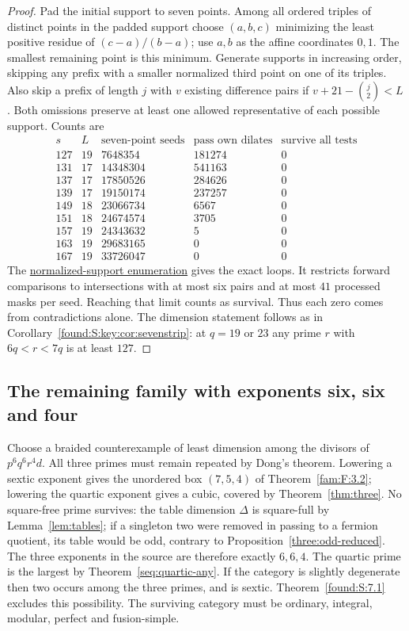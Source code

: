 \documentclass[11pt,a4paper]{article}
\numberwithin{equation}{section}
\theoremstyle{remark}
\begin{document}
\begin{proof}
Pad the initial support to seven points. Among all ordered triples of
distinct points in the padded support choose $(a,b,c)$ minimizing the
least positive residue of $(c-a)/(b-a)$; use $a,b$ as the affine
coordinates $0,1$. The smallest remaining point is this minimum.
Generate supports in increasing order, skipping any prefix with a
smaller normalized third point on one of its triples. Also skip a
prefix of length $j$ with $v$ existing difference pairs if
$v+21-\binom j2<L$. Both omissions preserve at least one allowed
representative of each possible support. Counts are
\[
\begin{array}{r|r|r|r|r}
s&L&\text{seven-point seeds}&\text{pass own dilates}&
\text{survive all tests}\\\hline
127&19&7648354&181274&0\\
131&17&14348304&541163&0\\
137&17&17850526&284626&0\\
139&17&19150174&237257&0\\
149&18&23066734&6567&0\\
151&18&24674574&3705&0\\
157&19&24343632&5&0\\
163&19&29683165&0&0\\
167&19&33726047&0&0
\end{array}
\]
The \href{https://github.com/sebastienpalcoux/WGT-fusion-categories/blob/f7f9f9a02f3116e61eb9dca4eebfed77001494e8/code/strip_extra.cpp}{normalized-support enumeration} gives the exact
loops. It restricts forward comparisons to intersections with at most
six pairs and at most $41$ processed masks per seed. Reaching that
limit counts as survival. Thus each zero comes from contradictions
alone. The dimension statement follows as in Corollary~\ref{found:S:key:cor:sevenstrip}:
at $q=19$ or $23$ any prime $r$ with $6q<r<7q$ is at least $127$.
\end{proof}

\subsection{The remaining family with exponents six, six and four}\label{sec:boundary}

Choose a braided counterexample of least dimension among the divisors of $p^6q^6r^4d$. All three primes must remain repeated by Dong's theorem. Lowering a sextic exponent gives the unordered box $(7,5,4)$ of Theorem~\ref{fam:F:3.2}; lowering the quartic exponent gives a cubic, covered by Theorem~\ref{thm:three}. No square-free prime survives: the table dimension $\Delta$ is square-full by Lemma~\ref{lem:tables}; if a singleton two were removed in passing to a fermion quotient, its table would be odd, contrary to Proposition~\ref{three:odd-reduced}. The three exponents in the source are therefore exactly $6,6,4$. The quartic prime is the largest by Theorem~\ref{seq:quartic-any}. If the category is slightly degenerate then two occurs among the three primes, and is sextic. Theorem~\ref{found:S:7.1} excludes this possibility. The surviving category must be ordinary, integral, modular, perfect and fusion-simple.
\end{document}
